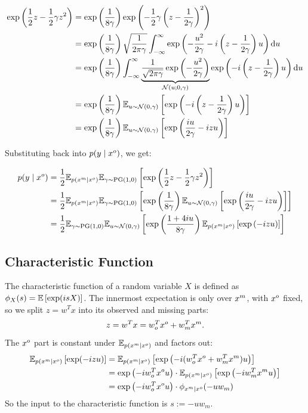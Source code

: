 \begin{align}
  \exp \left(\frac{1}{2}z - \frac{1}{2}\gamma z^2 \right)
  &= \exp \left(\frac{1}{8\gamma}\right) \exp \left(-\frac{1}{2} \gamma \left(z - \frac{1}{2\gamma}\right)^{2} \right) \notag \\
  &= \exp \left(\frac{1}{8\gamma}\right) \sqrt{\frac{1}{2\pi\gamma}} \int_{-\infty}^{\infty} \exp \left(-\frac{u^2}{2\gamma} - i \left(z - \frac{1}{2\gamma}\right) u\right) \mathrm{d}u\notag \\
  &= \exp \left(\frac{1}{8\gamma}\right) \int_{-\infty}^{\infty} \underbrace{\frac{1}{\sqrt{2\pi\gamma}} \exp \left(-\frac{u^2}{2\gamma}\right)}_{\mathcal{N}(u; 0, \gamma)} \exp \left(-i \left(z - \frac{1}{2\gamma}\right) u \right) \mathrm{d}u \notag \\
  &= \exp \left(\frac{1}{8\gamma}\right) \mathbb{E}_{u \sim \mathcal{N}(0, \gamma)} \left[ \exp \left(-i \left(z - \frac{1}{2\gamma}\right) u \right) \right] \notag \\
  &= \exp \left(\frac{1}{8\gamma}\right) \mathbb{E}_{u \sim \mathcal{N}(0, \gamma)} \left[ \exp \left(\frac{iu}{2\gamma} - izu \right) \right]
\end{align}

Substituting back into $p(y \mid x^o)$, we get:

\begin{align*}
  p(y \mid x^o)
  &= \frac{1}{2} \mathbb{E}_{p(x^m \mid x^o)} \mathbb{E}_{\gamma \sim \mathrm{PG}(1,0)}
     \left[ \exp \left(\frac{1}{2}z - \frac{1}{2}\gamma z^2 \right) \right] \\
  &= \frac{1}{2} \mathbb{E}_{p(x^m \mid x^o)} \mathbb{E}_{\gamma \sim \mathrm{PG}(1,0)}
     \left[ \exp \left(\frac{1}{8\gamma}\right) \mathbb{E}_{u \sim \mathcal{N}(0, \gamma)}
     \left[ \exp \left(\frac{iu}{2\gamma} - izu \right) \right] \right] \\
  &= \frac{1}{2} \mathbb{E}_{\gamma \sim \mathrm{PG}(1,0)} \mathbb{E}_{u \sim \mathcal{N}(0, \gamma)}
     \left[ \exp \left(\frac{1 + 4iu}{8\gamma}\right)
     \mathbb{E}_{p(x^m \mid x^o)} \left[ \exp \left(-izu \right) \right] \right]
\end{align*}

\subsection{Characteristic Function}

The characteristic function of a random variable $X$ is defined as $\phi_X(s) = \mathbb{E} \left[ \exp(isX) \right]$.
The innermost expectation is only over $x^m$, with $x^o$ fixed, so we split $z = w^T x$ into its observed and missing parts:
\[
  z = w^T x = w_o^T x^o + w_m^T x^m.
\]
The $x^o$ part is constant under $\mathbb{E}_{p(x^m \mid x^o)}$ and factors out:
\begin{align*}
  \mathbb{E}_{p(x^m \mid x^o)} \left[ \exp(-izu) \right]
  &= \mathbb{E}_{p(x^m \mid x^o)} \left[ \exp\left(-i(w_o^T x^o + w_m^T x^m)u\right) \right] \\
  &= \exp\left(-iw_o^T x^o u\right) \cdot \mathbb{E}_{p(x^m \mid x^o)} \left[ \exp\left(-iw_m^T x^m u\right) \right] \\
  &= \exp\left(-iw_o^T x^o u\right) \cdot \phi_{x^m \mid x^o}(-uw_m)
\end{align*}
So the input to the characteristic function is $s := -uw_m$.

